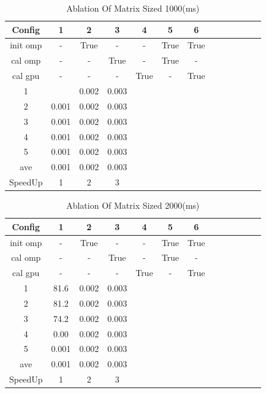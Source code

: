 \documentclass{article}
\begin{document}
\begin{table}[ht]
    \centering
    \begin{tabular}{|c|c|c|c|c|c|c|c|c|c|c|c|c|}
        \hline
        Config & 1 & 2 & 3 & 4 & 5 & 6 \\
        \hline
        init omp & - & True & - & - & True & True\\
        \hline
        cal omp & - & - & True & - & True & - \\
        \hline
        cal gpu & - & - & - & True & - & True \\
        \hline
        1 &  & 0.002 & 0.003 &  &  & \\
        2 & 0.001 & 0.002 & 0.003 &  &  & \\
        3 & 0.001 & 0.002 & 0.003 &  &  & \\
        4 & 0.001 & 0.002 & 0.003 &  &  & \\
        5 & 0.001 & 0.002 & 0.003 &  &  & \\
        ave & 0.001 & 0.002 & 0.003 &  &  & \\
        SpeedUp & 1 & 2 & 3 &  &  & \\
        \hline
    \end{tabular}
    \caption{Ablation Of Matrix Sized 1000(ms)}
    \label{tab:1}
\end{table}
\begin{table}[ht]
    \centering
    \begin{tabular}{|c|c|c|c|c|c|c|c|c|c|c|c|c|}
        \hline
        Config & 1 & 2 & 3 & 4 & 5 & 6 \\
        \hline
        init omp & - & True & - & - & True & True\\
        \hline
        cal omp & - & - & True & - & True & - \\
        \hline
        cal gpu & - & - & - & True & - & True \\
        \hline
        1 & 81.6 & 0.002 & 0.003 &  &  & \\
        2 & 81.2 & 0.002 & 0.003 &  &  & \\
        3 & 74.2 & 0.002 & 0.003 &  &  & \\
        4 & 0.00 & 0.002 & 0.003 &  &  & \\
        5 & 0.001 & 0.002 & 0.003 &  &  & \\
        ave & 0.001 & 0.002 & 0.003 &  &  & \\
        SpeedUp & 1 & 2 & 3 &  &  & \\
        \hline
    \end{tabular}
    \caption{Ablation Of Matrix Sized 2000(ms)}
    \label{tab:2}
\end{table}
\end{document}
